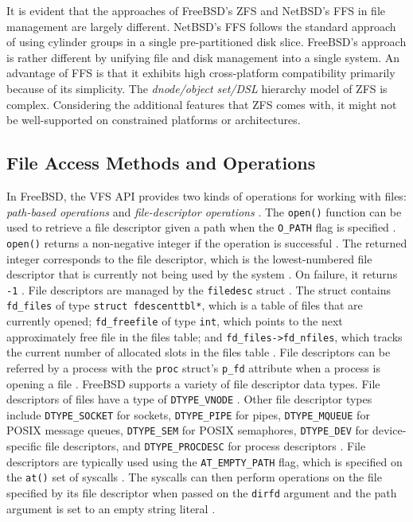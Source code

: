It is evident that the approaches of FreeBSD's ZFS and NetBSD's FFS in file management are largely different. NetBSD's FFS
follows the standard approach of using cylinder groups in a single pre-partitioned disk slice. FreeBSD's approach is rather
different by unifying file and disk management into a single system. An advantage of FFS is that it exhibits high cross-platform
compatibility primarily because of its simplicity. The \textit{dnode/object set/DSL} hierarchy model of ZFS is complex.
Considering the additional features that ZFS comes with, it might not be well-supported on constrained platforms or
architectures.

\subsection{File Access Methods and Operations} \label{file-access-methods} %

In FreeBSD, the VFS API provides two kinds of operations for working with files: \textit{path-based operations} and
\textit{file-descriptor operations} \parencite{jensen2021}. The \texttt{open()} function can be used to retrieve a file
descriptor given a path when the \texttt{O\_PATH} flag is specified \parencite{jensen2021}.
\texttt{open()} returns a non-negative integer if the operation is
successful \parencite{freebsd_open}. The returned integer corresponds to the file descriptor, which is the lowest-numbered
file descriptor that is currently not being used by the system \parencite{freebsd_open}. On failure, it returns \texttt{-1}
\parencite{freebsd_open}. File descriptors are managed by the \texttt{filedesc} struct \parencite{freebsd_filedesc_h}.
The struct contains \texttt{fd\_files} of type \texttt{struct fdescenttbl*}, which is a table of files that are currently
opened; \texttt{fd\_freefile} of type \texttt{int}, which points to the next approximately free file in the files table; and
\texttt{fd\_files->fd\_nfiles}, which tracks the current number of allocated slots in the files table \parencite{freebsd_filedesc_h}.
File descriptors can be referred by a process with the \texttt{proc} struct's \texttt{p\_fd} attribute when a process is opening a
file \parencite{freebsd_proc_h}. FreeBSD supports a variety of file descriptor data types. File descriptors of files have a
type of \texttt{DTYPE\_VNODE} \parencite{freebsd_file_h}. Other file descriptor types include \texttt{DTYPE\_SOCKET} for sockets,
\texttt{DTYPE\_PIPE} for pipes, \texttt{DTYPE\_MQUEUE} for POSIX message queues, \texttt{DTYPE\_SEM} for POSIX semaphores,
\texttt{DTYPE\_DEV} for device-specific file descriptors, and \texttt{DTYPE\_PROCDESC} for process descriptors \parencite{freebsd_file_h}.
File descriptors are typically used using the \texttt{AT\_EMPTY\_PATH} flag, which is specified on the \texttt{at()} set of syscalls
\parencite{jensen2021}. The syscalls can then perform operations on the file specified by its file descriptor when passed on the
\texttt{dirfd} argument and the path argument is set to an empty string literal \parencite{jensen2021}.

